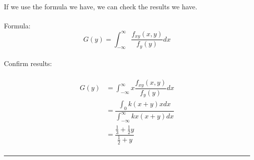\documentclass{article}
\begin{document}
If we use the formula we have, we can check the results we have.\\
\\
Formula: \\
$$G(y) = \int_{-\infty}^{\infty} \dfrac{f_{xy}(x,y)}{f_{y}(y)} dx$$
\\
Confirm results:\\
\\
\begin{equation*}
  \begin{split}
    G(y) &= \int_{-\infty}^{\infty} x\dfrac{f_{xy}(x,y)}{f_{y}(y)} dx          \\
         &= \dfrac{\int_{0}^{} k(x+y)xdx}{\int_{-\infty}^{\infty} kx(x+y) dx} \\
         &= \dfrac{\frac{1}{3} + \frac{1}{2}y}{\frac{1}{2} + y}            \\
  \end{split}
\end{equation*}

\noindent\rule{15cm}{0.4pt}%
\end{document}
